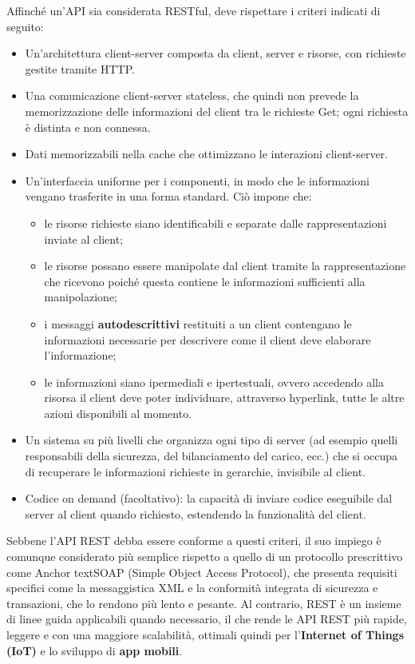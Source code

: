 \documentclass{article}
\begin{document}
        Affinché un'API sia considerata RESTful, deve rispettare i criteri indicati di seguito:
        \begin{itemize}
            \item Un'architettura client-server composta da client, server e risorse, con richieste gestite tramite HTTP.
            \item Una comunicazione client-server stateless, che quindi non prevede la memorizzazione delle informazioni del client tra le richieste Get; ogni richiesta è distinta e non connessa.
            \item Dati memorizzabili nella cache che ottimizzano le interazioni client-server.
            \item Un'interfaccia uniforme per i componenti, in modo che le informazioni vengano trasferite in una forma standard. Ciò impone che:
                \begin{itemize}
                    \item le risorse richieste siano identificabili e separate dalle rappresentazioni inviate al client;
                    \item le risorse possano essere manipolate dal client tramite la rappresentazione che ricevono poiché questa contiene le informazioni sufficienti alla manipolazione;
                    \item i messaggi \textbf{autodescrittivi} restituiti a un client contengano le informazioni necessarie per descrivere come il client deve elaborare l'informazione;
                    \item le informazioni siano ipermediali e ipertestuali, ovvero accedendo alla risorsa il client deve poter individuare, attraverso hyperlink, tutte le altre azioni disponibili al momento.
                \end{itemize}
            \item Un sistema su più livelli che organizza ogni tipo di server (ad esempio quelli responsabili della sicurezza, del bilanciamento del carico, ecc.) che si occupa di recuperare le informazioni richieste in gerarchie, invisibile al client.
            \item Codice on demand (facoltativo): la capacità di inviare codice eseguibile dal server al client quando richiesto, estendendo la funzionalità del client. 
        \end{itemize}

        Sebbene l'API REST debba essere conforme a questi criteri, il suo impiego è comunque considerato più semplice rispetto a quello di un protocollo prescrittivo come Anchor textSOAP (Simple Object Access Protocol), che presenta requisiti specifici come la messaggistica XML e la conformità integrata di sicurezza e transazioni, che lo rendono più lento e pesante. 
        Al contrario, REST è un insieme di linee guida applicabili quando necessario, il che rende le API REST più rapide, leggere e con una maggiore scalabilità, ottimali quindi per l'\textbf{Internet of Things (IoT)} e lo sviluppo di \textbf{app mobili}. 
    
\end{document}
